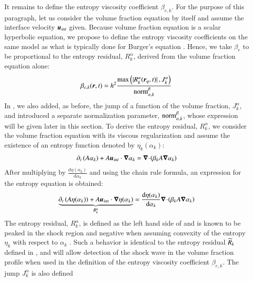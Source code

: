 \documentclass[preprint,10pt]{elsarticle}
\begin{document}
It remains to define the entropy viscosity coefficient $\beta_{e,k}$. For the purpose of this paragraph, let us consider the volume fraction equation 
by itself and assume the interface velocity $\boldsymbol u_{int}$ given. 
Because volume fraction equation is a scalar hyperbolic equation, we propose to define the entropy viscosity coefficients on the same model as 
what is typically done for Burger's equation \cite{GuermondJCP2011, GuermondCSE2011}. Hence, we take $\beta_e$ to be proportional to the entropy residual, $R_{k}^\alpha$, derived from the 
volume fraction equation alone:
%
\begin{align}\label{eq:def-beta-sen-sect4}
\beta_{e,k}( \boldsymbol r, t) = h^2 \frac{\max\left( | R_{k}^\alpha(\boldsymbol r_q,t) |\,,  J_k^\alpha \right)}{\textrm{norm}_{\alpha, k}^\beta} \,
\end{align}
%
In , we also added, as before, the jump of a function of the volume fraction, $J_k^\alpha$, and
introduced a separate normalization parameter, $\textrm{norm}_{\alpha,k}^\beta$, whose expression will be given later in this section. To derive the 
entropy residual, $ R_{k}^\alpha$, 
we consider the volume fraction equation with its viscous regularization and assume the existence of an entropy function denoted by $\eta_k(\alpha_k)$:
%
\begin{equation}\label{eq:vf-sem-sct4}
\partial_t \left(A \alpha_k \right) + A \boldsymbol u_{int} \cdot \boldsymbol\nabla \alpha_k = \boldsymbol\nabla\! \cdot \! \left( \beta_k A \boldsymbol\nabla \alpha_k \right)
\end{equation}
% 
After multiplying by $\frac{\text{d} \eta (\alpha_k)}{\text{d} \alpha_k}$ and using the chain rule formula, an expression for the entropy equation is obtained:
%
\begin{equation}\label{eq:vf-sem2-sct4}
\underbrace{\partial_t \left(A \eta(\alpha_k) \right) + A \boldsymbol u_{int} \cdot \boldsymbol\nabla \eta(\alpha_k)}_{R_{k}^\alpha} = \frac{\text{d} \eta (\alpha_k)}{\text{d} \alpha_k} 
\boldsymbol\nabla\! \cdot \! \left( \beta_k A \boldsymbol\nabla \alpha_k \right)
\end{equation}
% 
The entropy residual, $R_{k}^\alpha$, is defined as the left hand side of  and is known to be peaked in the shock region and negative 
when assuming convexity of the 
entropy $\eta_k$ with respect to $\alpha_k$ \cite{Leveque}. Such a behavior is identical to the entropy residual $\widetilde{R}_k$ defined in , 
and will allow detection of the 
shock wave in the volume fraction profile when used in the definition of the entropy viscosity coefficient $\beta_{e,k}$. The jump $J_k^\alpha$ is also defined 
\end{document}
